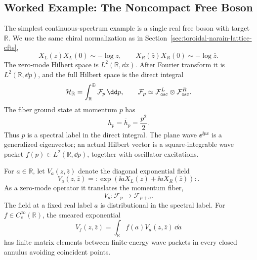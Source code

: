 \subsection{Worked Example: The Noncompact Free Boson}
\label{subsec:noncompact-free-boson-direct-integral}

The simplest continuous-spectrum example is a single real free boson with
target \(\mathbb R\).  We use the same chiral normalization as in
Section~\ref{sec:toroidal-narain-lattice-cfts},
\[
  X_L(z)X_L(0)\sim-\log z,\qquad
  X_R(\bar z)X_R(0)\sim-\log\bar z.
\]
The zero-mode Hilbert space is \(L^2(\mathbb R,\dd x)\).  After Fourier
transform it is \(L^2(\mathbb R,\dd p)\), and the full Hilbert space is the
direct integral
\begin{equation}
  \mathcal H_{\mathbb R}
  =
  \int_{\mathbb R}^{\oplus}
  \mathcal F_{p}\,\dd p,
  \qquad
  \mathcal F_p\simeq\mathcal F_{\rm osc}^L\otimes
  \mathcal F_{\rm osc}^R .
  \label{eq:noncompact-boson-hilbert-direct-integral}
\end{equation}
The fiber ground state at momentum \(p\) has
\begin{equation}
  h_p=\bar h_p=\frac{p^2}{2}.
  \label{eq:noncompact-boson-weights}
\end{equation}
Thus \(p\) is a spectral label in the direct integral.  The plane wave
\(\ee^{\ii p x}\) is a generalized eigenvector; an actual Hilbert vector is a
square-integrable wave packet \(f(p)\in L^2(\mathbb R,\dd p)\), together with
oscillator excitations.

For \(a\in\mathbb R\), let \(V_a(z,\bar z)\) denote the diagonal exponential
field
\[
  V_a(z,\bar z)
  =
  :\exp\!\left(\ii aX_L(z)+\ii aX_R(\bar z)\right): .
\]
As a zero-mode operator it translates the momentum fiber,
\[
  V_a:\mathcal F_p\longrightarrow \mathcal F_{p+a}.
\]
The field at a fixed real label \(a\) is distributional in the spectral
label.  For \(f\in C_c^\infty(\mathbb R)\), the smeared exponential
\begin{equation}
  V_f(z,\bar z)
  =
  \int_{\mathbb R} f(a)V_a(z,\bar z)\,\dd a
  \label{eq:noncompact-boson-smeared-vertex}
\end{equation}
has finite matrix elements between finite-energy wave packets in every
closed annulus avoiding coincident points.


